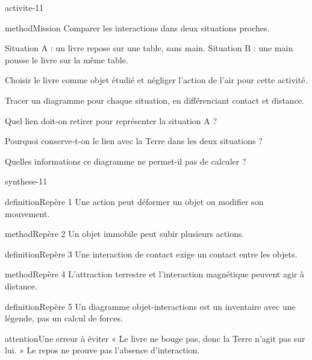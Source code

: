 \documentclass[12pt,twoside,openany]{book}
\begin{document}
\label{ch-11-activite}
\begin{pcFiche}{activite-11}
\begin{pcEncadre}{method}{Mission}
Comparer les interactions dans deux situations proches.\par
\end{pcEncadre}
\begin{questions}
\item Situation A : un livre repose sur une table, sans main. Situation B : une main pousse le livre sur la même table.
\item Choisir le livre comme objet étudié et négliger l’action de l’air pour cette activité.
\item Tracer un diagramme pour chaque situation, en différenciant contact et distance.
\end{questions}
\begin{questions}
\item Quel lien doit-on retirer pour représenter la situation A ?
\item Pourquoi conserve-t-on le lien avec la Terre dans les deux situations ?
\item Quelles informations ce diagramme ne permet-il pas de calculer ?
\end{questions}
\end{pcFiche}
\label{ch-11-bilan}
\begin{pcFiche}{synthese-11}
\begin{pcEncadre}{definition}{Repère 1}
Une action peut déformer un objet ou modifier son mouvement.\par
\end{pcEncadre}
\begin{pcEncadre}{method}{Repère 2}
Un objet immobile peut subir plusieurs actions.\par
\end{pcEncadre}
\begin{pcEncadre}{definition}{Repère 3}
Une interaction de contact exige un contact entre les objets.\par
\end{pcEncadre}
\begin{pcEncadre}{method}{Repère 4}
L’attraction terrestre et l’interaction magnétique peuvent agir à distance.\par
\end{pcEncadre}
\begin{pcEncadre}{definition}{Repère 5}
Un diagramme objet-interactions est un inventaire avec une légende, pas un calcul de forces.\par
\end{pcEncadre}
\begin{pcEncadre}{attention}{Une erreur à éviter}
« Le livre ne bouge pas, donc la Terre n’agit pas sur lui. » Le repos ne prouve pas l’absence d’interaction.\par
\end{pcEncadre}
\end{pcFiche}
\end{document}
